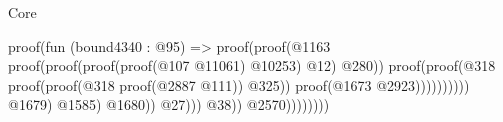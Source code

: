 \begin{lexlean}{Core}
\begin{coremodule}
                                                                                                                        proof(fun (bound4340 : @95) =>
                                                                                                                          proof(proof(@1163
                                                                                                                                proof(proof(proof(proof(@107
                                                                                                                                          @11061)
                                                                                                                                        @10253)
                                                                                                                                      @12)
                                                                                                                                    @280))
                                                                                                                              proof(proof(@318
                                                                                                                                    proof(proof(@318
                                                                                                                                          proof(@2887
                                                                                                                                              @111))
                                                                                                                                        @325))
                                                                                                                                  proof(@1673
                                                                                                                                      @2923))))))))))
                                                                                                        @1679)
                                                                                                      @1585)
                                                                                                    @1680))
                                                                                              @27)))
                                                                                      @38))
                                                                                @2570))))))))

\end{coremodule}
\end{lexlean}
